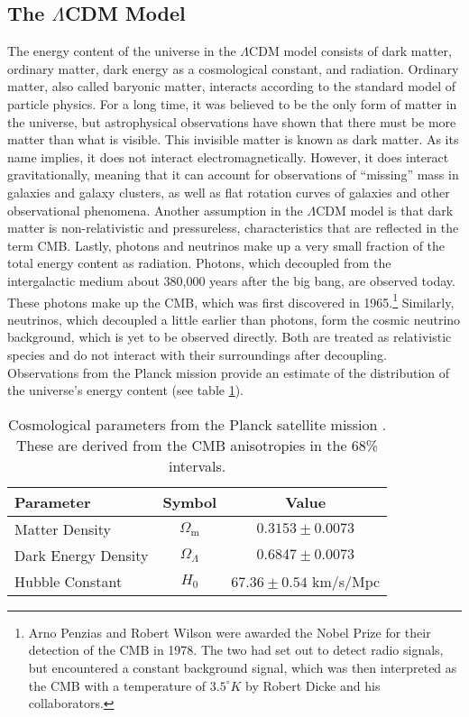 \documentclass[12pt]{article}
\begin{document}
\subsection{The \texorpdfstring{$\Lambda$CDM}{LambdaCDM} Model}
The energy content of the universe in the $\Lambda$CDM model consists of dark matter, ordinary matter, dark energy as a cosmological constant, and radiation. Ordinary matter, also called baryonic matter, interacts according to the standard model of particle physics. For a long time, it was believed to be the only form of matter in the universe, but astrophysical observations have shown that there must be more matter than what is visible. This invisible matter is known as dark matter. As its name implies, it does not interact electromagnetically. However, it does interact gravitationally, meaning that it can account for observations of ``missing'' mass in galaxies and galaxy clusters, as well as flat rotation curves of galaxies and other observational phenomena. Another assumption in the $\Lambda$CDM model is that dark matter is non-relativistic and pressureless, characteristics that are reflected in the term CMB. Lastly, photons and neutrinos make up a very small fraction of the total energy content as radiation. Photons, which decoupled from the intergalactic medium about 380,000 years after the big bang, are observed today. These photons make up the CMB, which was first discovered in 1965.\footnote{Arno Penzias and Robert Wilson were awarded the Nobel Prize for their detection of the CMB in 1978. The two had set out to detect radio signals, but encountered a constant background signal, which was then interpreted as the CMB with a temperature of $3.5^\circ K$ by Robert Dicke and his collaborators.} Similarly, neutrinos, which decoupled a little earlier than photons, form the cosmic neutrino background, which is yet to be observed directly. Both are treated as relativistic species and do not interact with their surroundings after decoupling. Observations from the Planck mission provide an estimate of the distribution of the universe's energy content (see table \ref{GR:tab:planckdensityparam}).
\begin{table}[t!]
    \centering
    \begin{tabular}{lcc}
        \toprule
        \textbf{Parameter} & \textbf{Symbol} & \textbf{Value} \\
        \midrule
        Matter Density & $\Omega_{\mathrm{m}}$ & $0.3153 \pm 0.0073$ \\
        Dark Energy Density & $\Omega_\Lambda$ & $0.6847 \pm 0.0073$ \\
        Hubble Constant & $H_0$ & $67.36\pm 0.54$ km/s/Mpc \\
        \bottomrule
    \end{tabular}
    \caption[Cosmological parameters from the Planck satellite mission .]{Cosmological parameters from the Planck satellite mission . These are derived from the CMB anisotropies in the 68\% intervals.}
    \label{GR:tab:planckdensityparam}
\end{table}
\end{document}
